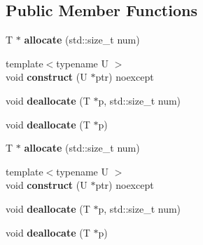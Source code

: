 \subsection*{Public Member Functions}
\begin{DoxyCompactItemize}
\item 
\hypertarget{structzlib__aligned__allocator_a7bb6564c8ff34ec174e22a82e3259318}{T $\ast$ {\bfseries allocate} (std\-::size\-\_\-t num)}\label{structzlib__aligned__allocator_a7bb6564c8ff34ec174e22a82e3259318}

\item 
\hypertarget{structzlib__aligned__allocator_a536bca0042d96f416eec564fedc24dcd}{{\footnotesize template$<$typename U $>$ }\\void {\bfseries construct} (U $\ast$ptr) noexcept}\label{structzlib__aligned__allocator_a536bca0042d96f416eec564fedc24dcd}

\item 
\hypertarget{structzlib__aligned__allocator_a2cc7874853131a3de9a8947075f6237b}{void {\bfseries deallocate} (T $\ast$p, std\-::size\-\_\-t num)}\label{structzlib__aligned__allocator_a2cc7874853131a3de9a8947075f6237b}

\item 
\hypertarget{structzlib__aligned__allocator_a193f6feac7c4efcaae2ed95dbb169d11}{void {\bfseries deallocate} (T $\ast$p)}\label{structzlib__aligned__allocator_a193f6feac7c4efcaae2ed95dbb169d11}

\item 
\hypertarget{structzlib__aligned__allocator_a7bb6564c8ff34ec174e22a82e3259318}{T $\ast$ {\bfseries allocate} (std\-::size\-\_\-t num)}\label{structzlib__aligned__allocator_a7bb6564c8ff34ec174e22a82e3259318}

\item 
\hypertarget{structzlib__aligned__allocator_a536bca0042d96f416eec564fedc24dcd}{{\footnotesize template$<$typename U $>$ }\\void {\bfseries construct} (U $\ast$ptr) noexcept}\label{structzlib__aligned__allocator_a536bca0042d96f416eec564fedc24dcd}

\item 
\hypertarget{structzlib__aligned__allocator_a2cc7874853131a3de9a8947075f6237b}{void {\bfseries deallocate} (T $\ast$p, std\-::size\-\_\-t num)}\label{structzlib__aligned__allocator_a2cc7874853131a3de9a8947075f6237b}

\item 
\hypertarget{structzlib__aligned__allocator_a193f6feac7c4efcaae2ed95dbb169d11}{void {\bfseries deallocate} (T $\ast$p)}\label{structzlib__aligned__allocator_a193f6feac7c4efcaae2ed95dbb169d11}

\end{DoxyCompactItemize}


